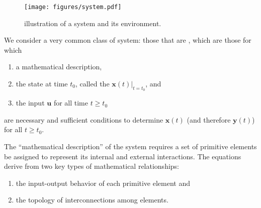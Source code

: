\documentclass[dynamic_systems.tex]{subfiles}
\begin{document}
\begin{figure}[b]
	\centering
	\texttt{[image: figures/system.pdf]}
	\caption{illustration of a system and its environment.}
	\label{fig:system}
\end{figure}

We consider a very common class of system: those that are , which are those for which \citep{Rowell1997}
\tags{}

\begin{enumerate}
	\item a mathematical description,
	\item the state at time $t_0$, called the  $\bm{x}(t)|_{t=t_0}$, and
	\item the input $\bm{u}$ for all time $t\ge t_0$
\end{enumerate}

are necessary and sufficient conditions to determine $\bm{x}(t)$ (and therefore $\bm{y}(t)$) for all $t\ge t_0$.
\tags{}

The ``mathematical description'' of the system requires a set of primitive elements be assigned to represent its internal and external interactions. 
The equations derive from two key types of mathematical relationships:
\tags{}
\begin{enumerate}
	\item the input-output behavior of each primitive element and
	\item the topology of interconnections among elements.
\end{enumerate}
\end{document}
